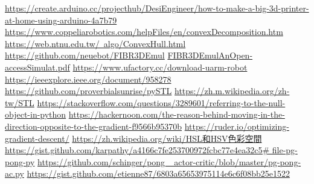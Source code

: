\newpage
\renewcommand\bibname{參~考~文~獻}
\begin{thebibliography}{99}  %
\href{https://create.arduino.cc/projecthub/DesiEngineer/how-to-make-a-big-3d-printer-at-home-using-arduino-4a7b79}{https://create.arduino.cc/projecthub/DesiEngineer/how-to-make-a-big-3d-printer-at-home-using-arduino-4a7b79}
\href{https://www.coppeliarobotics.com/helpFiles/en/convexDecomposition.htm}{https://www.coppeliarobotics.com/helpFiles/en/convexDecomposition.htm}
\href{https://web.ntnu.edu.tw/~algo/ConvexHull.html}{https://web.ntnu.edu.tw/~algo/ConvexHull.html}
\href{https://github.com/neuebot/FIBR3DEmul}{https://github.com/neuebot/FIBR3DEmul}
\href{https://repositorium.sdum.uminho.pt/bitstream/1822/69730/1/Faria2020_Article_FIBR3DEmulAnOpen-accessSimulat.pdf}{FIBR3DEmulAnOpen-accessSimulat.pdf}
\href{https://www.ufactory.cc/download-uarm-robot}{https://www.ufactory.cc/download-uarm-robot}
\href{https://ieeexplore.ieee.org/document/958278}{https://ieeexplore.ieee.org/document/958278}
\href{https://github.com/proverbialsunrise/pySTL}{https://github.com/proverbialsunrise/pySTL}
\href{https://zh.m.wikipedia.org/zh-tw/STL}{https://zh.m.wikipedia.org/zh-tw/STL}
\href{https://stackoverflow.com/questions/3289601/referring-to-the-null-object-in-python}{https://stackoverflow.com/questions/3289601/referring-to-the-null-object-in-python}
\href{https://hackernoon.com/the-reason-behind-moving-in-the-direction-opposite-to-the-gradient-f9566b95370b}{https://hackernoon.com/the-reason-behind-moving-in-the-direction-opposite-to-the-gradient-f9566b95370b}\label{OGD}
\href{https://ruder.io/optimizing-gradient-descent/}{https://ruder.io/optimizing-gradient-descent/}
\label{OGD2}
\href{https://reurl.cc/43XjEL}{https://zh.wikipedia.org/wiki/HSL和HSV色彩空間}
\label{RGBtoHSV}
\href{https://reurl.cc/gzMm4N}{https://gist.github.com/karpathy/a4166c7fe253700972fcbc77e4ea32c5\# file-pg-pong-py}\label{R.pong1}
\href{https://reurl.cc/95172Y}{https://github.com/schinger/pong\_ actor-critic/blob/master/pg-pong-ac.py}\label{R.pong1.1}
\href{https://gist.github.com/etienne87/6803a65653975114e6c6f08bb25e1522}{https://gist.github.com/etienne87/6803a65653975114e6c6f08bb25e1522}\label{R.pong2}
%
\end{thebibliography}
\newpage 